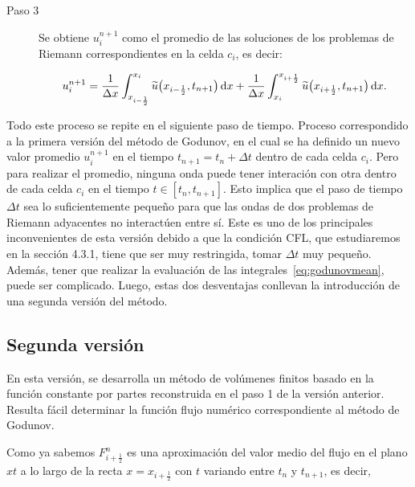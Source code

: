 \begin{description}
  \item[Paso 3]

        Se obtiene $u^{n+1}_{i}$ como el promedio de las soluciones
        de los problemas de Riemann correspondientes en la celda
        $c_{i}$, es decir:

        \begin{equation}\label{eq:godunovmean}
          u^{n+1}_{i}=
          \frac{1}{\Delta x}
          \int_{x_{i-\frac{1}{2}}}^{x_{i}}
          \widetilde{u}
          \big(
          x_{i-\frac{1}{2}},t_{n+1}
          \big)
          \dl x+
          \frac{1}{\Delta x}
          \int_{x_{i}}^{x_{i+\frac{1}{2}}}
          \widetilde{u}
          \big(
          x_{i+\frac{1}{2}},t_{n+1}
          \big)
          \dl x.
        \end{equation}
\end{description}

Todo este proceso se repite en el siguiente paso de tiempo.
Proceso correspondido a la primera versión del método de Godunov, en
el cual se ha definido un nuevo valor promedio $u^{n+1}_{i}$ en el
tiempo $t_{n+1}=t_{n}+\Delta t$ dentro de cada celda $c_{i}$.
Pero para realizar el promedio, ninguna onda puede tener interación
con otra dentro de cada celda $c_{i}$ en el tiempo
$t\in\left[t_{n},t_{n+1}\right]$.
Esto implica que el paso de tiempo $\Delta t$ sea lo suficientemente
pequeño para que las ondas de dos problemas de Riemann adyacentes no
interactúen entre sí.
Este es uno de los principales inconvenientes de esta versión debido
a que la condición CFL, que estudiaremos en la sección 4.3.1, tiene
que ser muy restringida, tomar $\Delta t$ muy pequeño.
Además, tener que realizar la evaluación de las
integrales~\eqref{eq:godunovmean}, puede ser complicado.
Luego, estas dos desventajas conllevan la introducción de una segunda
versión del método.

\subsection{Segunda versión}

En esta versión, se desarrolla un método de volúmenes finitos basado
en la función constante por partes reconstruida en el paso 1 de la
versión anterior.
Resulta fácil determinar la función flujo numérico correspondiente al
método de Godunov.

Como ya sabemos $F^{n}_{i+\frac{1}{2}}$ es una aproximación del valor
medio del flujo en el plano $xt$ a lo largo de la recta
$x=x_{i+\frac{1}{2}}$ con $t$ variando entre $t_{n}$ y $t_{n+1}$,
es decir,

